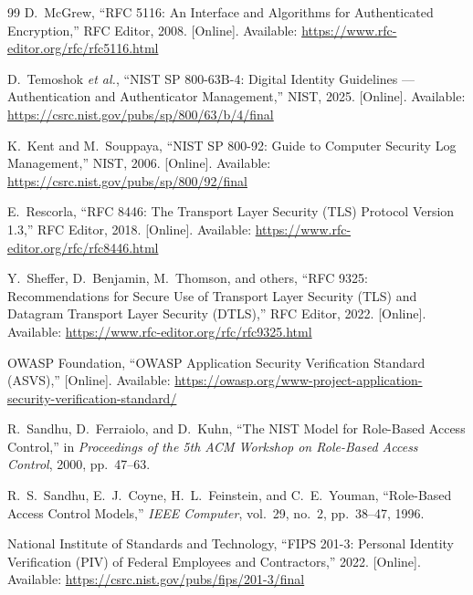 \documentclass[journal,a4paper,onecolumn]{IEEEtran}
\begin{document}
\begin{thebibliography}{99}
D.~McGrew, ``RFC 5116: An Interface and Algorithms for Authenticated Encryption,'' RFC Editor, 2008. [Online]. Available: \url{https://www.rfc-editor.org/rfc/rfc5116.html}

D.~Temoshok \emph{et al.}, ``NIST SP 800-63B-4: Digital Identity Guidelines --- Authentication and Authenticator Management,'' NIST, 2025. [Online]. Available: \url{https://csrc.nist.gov/pubs/sp/800/63/b/4/final}

K.~Kent and M.~Souppaya, ``NIST SP 800-92: Guide to Computer Security Log Management,'' NIST, 2006. [Online]. Available: \url{https://csrc.nist.gov/pubs/sp/800/92/final}

E.~Rescorla, ``RFC 8446: The Transport Layer Security (TLS) Protocol Version 1.3,'' RFC Editor, 2018. [Online]. Available: \url{https://www.rfc-editor.org/rfc/rfc8446.html}

Y.~Sheffer, D.~Benjamin, M.~Thomson, and others, ``RFC 9325: Recommendations for Secure Use of Transport Layer Security (TLS) and Datagram Transport Layer Security (DTLS),'' RFC Editor, 2022. [Online]. Available: \url{https://www.rfc-editor.org/rfc/rfc9325.html}

OWASP Foundation, ``OWASP Application Security Verification Standard (ASVS),'' [Online]. Available: \url{https://owasp.org/www-project-application-security-verification-standard/}

R.~Sandhu, D.~Ferraiolo, and D.~Kuhn, ``The NIST Model for Role-Based Access Control,'' in \emph{Proceedings of the 5th ACM Workshop on Role-Based Access Control}, 2000, pp.~47--63.

R.~S.~Sandhu, E.~J.~Coyne, H.~L.~Feinstein, and C.~E.~Youman, ``Role-Based Access Control Models,'' \emph{IEEE Computer}, vol.~29, no.~2, pp.~38--47, 1996.

National Institute of Standards and Technology, ``FIPS 201-3: Personal Identity Verification (PIV) of Federal Employees and Contractors,'' 2022. [Online]. Available: \url{https://csrc.nist.gov/pubs/fips/201-3/final}


\end{thebibliography}
\end{document}
